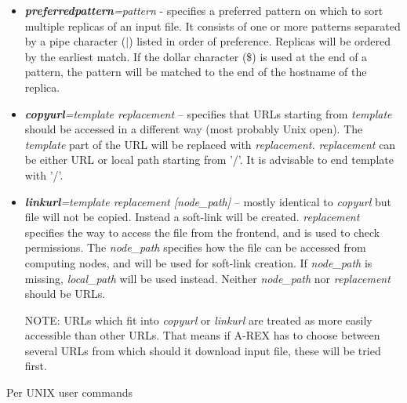 \documentclass{article}                            %
\begin{document}
\begin{itemize}
{max\_inactivity} -- specifies how long/slow data transfer is allowed
to take place. Transfer is canceled if transfer rate (bytes per second)
is lower than \emph{min\_speed} for at least \emph{min\_time} seconds,
or if average rate is lower than \emph{min\_average\_speed}, or no
data is received for longer than \textit{max\_inactivity} seconds. To
allow statistics to build up, no transfers will be stopped within the
first 3 minutes.
\item \textbf{\textit{preferredpattern}}\textit{=pattern} - specifies
  a preferred pattern on which to sort multiple replicas of an input
  file. It consists of one or more patterns separated by a pipe
  character ($|$) listed in order of preference. Replicas will be
  ordered by the earliest match. If the dollar character (\$) is used
  at the end of a pattern, the pattern will be matched to the end of
  the hostname of the replica.
\item \textbf{\textit{copyurl}}\textit{=template replacement} -- specifies
that URLs starting from \emph{template} should be accessed in a different
way (most probably Unix open). The \textit{template} part of the URL
will be replaced with \textit{replacement.} \textit{replacement} can
be either URL or local path starting from '/'. It is advisable to
end template with '/'.
\item \textbf{\textit{linkurl}}\textit{=template replacement {[}node\_path]}
-- mostly identical to \textit{copyurl} but file will not be copied. Instead
a soft-link will be created. \textit{replacement} specifies the way
to access the file from the frontend, and is used to check permissions.
The \textit{node\_path} specifies how the file can be accessed from
computing nodes, and will be used for soft-link creation. If \textit{node\_path}
is missing, \textit{local\_path} will be used instead. Neither \textit{node\_path}
nor \textit{replacement} should be URLs.
\begin{framed}
NOTE: URLs which fit into \textit{copyurl} or \textit{linkurl} are
treated as more easily accessible than other URLs. That means if A-REX
has to choose between several URLs from which should it download input
file, these will be tried first.
\end{framed}
\end{itemize}

Per UNIX user commands
\end{document}
